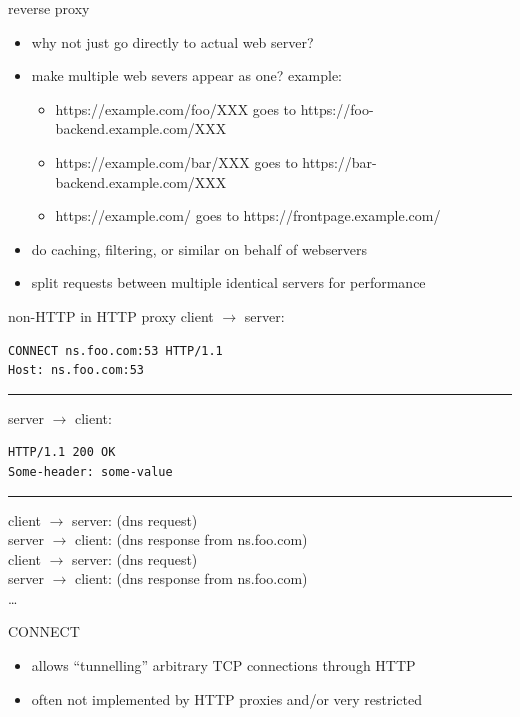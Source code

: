 \begin{frame}{reverse proxy}
    \begin{itemize}
    \item why not just go directly to actual web server?
    \vspace{.5cm}
    \item make multiple web severs appear as one? example:
        \begin{itemize}
        \item https://example.com/foo/XXX goes to https://foo-backend.example.com/XXX
        \item https://example.com/bar/XXX goes to https://bar-backend.example.com/XXX
        \item https://example.com/ goes to https://frontpage.example.com/
        \end{itemize}
    \item do caching, filtering, or similar on behalf of webservers
    \item split requests between multiple identical servers for performance
    \end{itemize}
\end{frame}

\begin{frame}[fragile]{non-HTTP in HTTP proxy}
\small
client $\rightarrow$ server:
\begin{Verbatim}
CONNECT ns.foo.com:53 HTTP/1.1
Host: ns.foo.com:53
\end{Verbatim}
\rule{.9\textwidth}{1mm}
server $\rightarrow$ client:
\begin{Verbatim}
HTTP/1.1 200 OK
Some-header: some-value

\end{Verbatim}
\rule{.9\textwidth}{1mm}
client $\rightarrow$ server: (dns request) \\
server $\rightarrow$ client: (dns response from ns.foo.com) \\
client $\rightarrow$ server: (dns request) \\
server $\rightarrow$ client: (dns response from ns.foo.com) \\
\ldots
\end{frame}

\begin{frame}{CONNECT}
    \begin{itemize}
    \item allows ``tunnelling'' arbitrary TCP connections through HTTP
    \item often not implemented by HTTP proxies and/or very restricted
    \end{itemize}
\end{frame}
